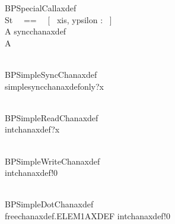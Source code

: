 \begin{circus}
\circprocess BPSpecialCallaxdef \circdef \circbegin \\
    \circstate St ~~==~~ [~ xis, ypsilon : \nat ~] \\
    A \circdef syncchanaxdef \then \Skip \\
    \circspot A \\
 \circend \\
\end{circus}

\begin{circus}
 \circprocess BPSimpleSyncChanaxdef \circdef \circbegin \\
    \circspot simplesyncchanaxdefonly?x \then \Skip \\
 \circend \\
\end{circus}
\begin{circus}
 \circprocess BPSimpleReadChanaxdef \circdef \circbegin \\
    \circspot intchanaxdef?x \then \Skip \\
 \circend \\
\end{circus}

\begin{circus}
 \circprocess BPSimpleWriteChanaxdef \circdef \circbegin \\
    \circspot intchanaxdef!0 \then \Skip \\
 \circend \\
\end{circus}

\begin{circus} 
 \circprocess BPSimpleDotChanaxdef \circdef \circbegin \\
    \circspot freechanaxdef.ELEM1AXDEF \then intchanaxdef!0 \then \Skip \\
 \circend \\
\end{circus}


